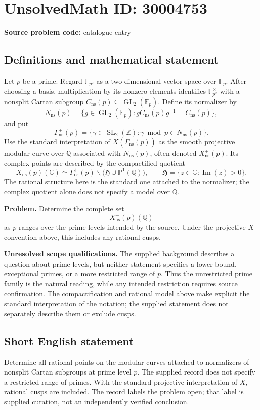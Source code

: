 \documentclass[11pt]{article}
\newcommand{\Z}{\mathbb{Z}}
\newcommand{\Q}{\mathbb{Q}}
\newcommand{\C}{\mathbb{C}}
\newcommand{\F}{\mathbb{F}}
\newcommand{\PP}{\mathbb{P}}
\begin{document}
\section*{UnsolvedMath ID: 30004753}
\textbf{Source problem code:} catalogue entry
\subsection{Definitions and mathematical statement}
Let \(p\) be a prime. Regard \(\F_{p^2}\) as a two-dimensional vector space over \(\F_p\). After choosing a basis, multiplication by its nonzero elements identifies \(\F_{p^2}^{\times}\) with a nonsplit Cartan subgroup \(C_{\mathrm{ns}}(p)\subseteq\operatorname{GL}_2(\F_p)\). Define its normalizer by
\[
N_{\mathrm{ns}}(p)=\{g\in\operatorname{GL}_2(\F_p):gC_{\mathrm{ns}}(p)g^{-1}=C_{\mathrm{ns}}(p)\},
\]
and put
\[
\Gamma_{\mathrm{ns}}^+(p)=\{\gamma\in\operatorname{SL}_2(\Z):\gamma\bmod p\in N_{\mathrm{ns}}(p)\}.
\]
Use the standard interpretation of \(X(\Gamma_{\mathrm{ns}}^+(p))\) as the smooth projective modular curve over \(\Q\) associated with \(N_{\mathrm{ns}}(p)\), often denoted \(X_{\mathrm{ns}}^+(p)\). Its complex points are described by the compactified quotient
\[
X_{\mathrm{ns}}^+(p)(\C)\simeq\Gamma_{\mathrm{ns}}^+(p)\backslash\bigl(\mathfrak H\cup\PP^1(\Q)\bigr),
\qquad \mathfrak H=\{z\in\C:\operatorname{Im}(z)>0\}.
\]
The rational structure here is the standard one attached to the normalizer; the complex quotient alone does not specify a model over \(\Q\).

\textbf{Problem.} Determine the complete set
\[
X_{\mathrm{ns}}^+(p)(\Q)
\]
as \(p\) ranges over the prime levels intended by the source. Under the projective \(X\)-convention above, this includes any rational cusps.

\textbf{Unresolved scope qualifications.} The supplied background describes a question about prime levels, but neither statement specifies a lower bound, exceptional primes, or a more restricted range of \(p\). Thus the unrestricted prime family is the natural reading, while any intended restriction requires source confirmation. The compactification and rational model above make explicit the standard interpretation of the notation; the supplied statement does not separately describe them or exclude cusps.
\subsection{Short English statement}
Determine all rational points on the modular curves attached to normalizers of nonsplit Cartan subgroups at prime level \(p\). The supplied record does not specify a restricted range of primes. With the standard projective interpretation of \(X\), rational cusps are included. The record labels the problem open; that label is supplied curation, not an independently verified conclusion.
\end{document}
